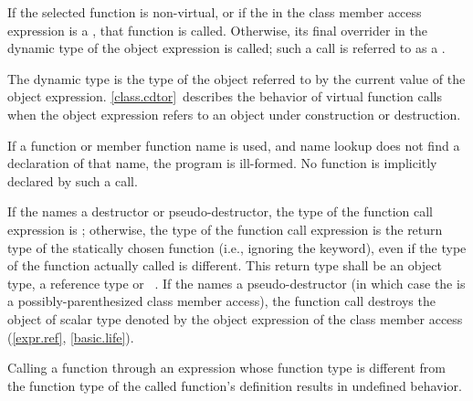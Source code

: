 \pnum
If the selected
function is non-virtual, or if the  in the class
member access expression is a , that function is
called. Otherwise, its final overrider in the dynamic type
of the object expression is called; such a call is referred to as a
.
\begin{note}
The dynamic type is the type of the object referred to by the
current value of the object expression. \ref{class.cdtor}~describes the
behavior of virtual function calls when the object expression
refers to
an object under construction or destruction.
\end{note}

\pnum
\begin{note}
If a function or member function name is used, and name
lookup does not find a declaration of that name,
the program is ill-formed. No function is implicitly declared by such a
call.
\end{note}

\pnum
If the  names
a destructor or pseudo-destructor,
the type of the function call expression is ; otherwise, the
type of the function call expression is the return type of the
statically chosen function (i.e., ignoring the  keyword),
even if the type of the function actually called is different.
%
This return type shall be an object type, a reference type or \cv{}~.
If the  names a pseudo-destructor
(in which case the 
is a possibly-parenthesized class member access),
the function call destroys
the object of scalar type
denoted by the object expression
of the class member access (\ref{expr.ref}, \ref{basic.life}).

\pnum
Calling a function through an
expression whose function type is different
from the function type of the called function's
definition results in undefined behavior.

